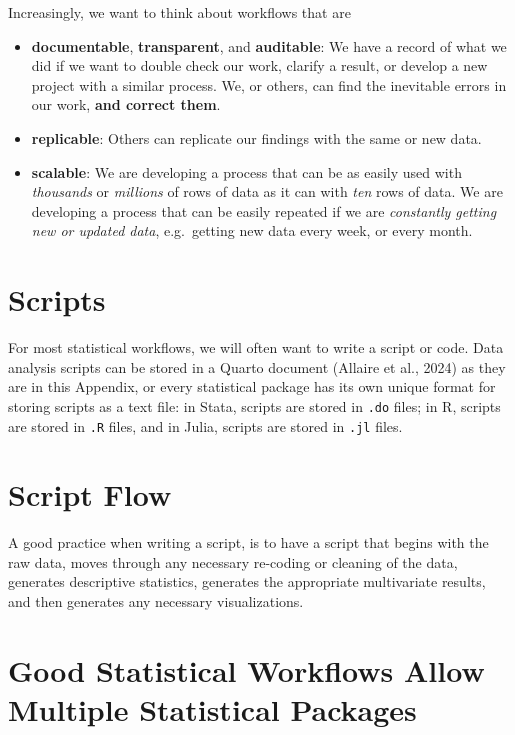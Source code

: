 \documentclass[
  letterpaper,
  DIV=11,
  numbers=noendperiod]{scrreprt}
\providecommand{\tightlist}{%
  \setlength{\itemsep}{0pt}\setlength{\parskip}{0pt}}\usepackage{longtable,booktabs,array}
\begin{document}
Increasingly, we want to think about workflows that are

\begin{itemize}
\tightlist
\item
  \textbf{documentable}, \textbf{transparent}, and \textbf{auditable}:
  We have a record of what we did if we want to double check our work,
  clarify a result, or develop a new project with a similar process. We,
  or others, can find the inevitable errors in our work, \textbf{and
  correct them}.
\item
  \textbf{replicable}: Others can replicate our findings with the same
  or new data.
\item
  \textbf{scalable}: We are developing a process that can be as easily
  used with \emph{thousands} or \emph{millions} of rows of data as it
  can with \emph{ten} rows of data. We are developing a process that can
  be easily repeated if we are \emph{constantly getting new or updated
  data}, e.g.~getting new data every week, or every month.
\end{itemize}

\section{Scripts}\label{scripts}

For most statistical workflows, we will often want to write a script or
code. Data analysis scripts can be stored in a Quarto document (Allaire
et al., 2024) as they are in this Appendix, or every statistical package
has its own unique format for storing scripts as a text file: in Stata,
scripts are stored in \texttt{.do} files; in R, scripts are stored in
\texttt{.R} files, and in Julia, scripts are stored in \texttt{.jl}
files.

\section{Script Flow}\label{sec-script-flow}

A good practice when writing a script, is to have a script that begins
with the raw data, moves through any necessary re-coding or cleaning of
the data, generates descriptive statistics, generates the appropriate
multivariate results, and then generates any necessary visualizations.

\section{Good Statistical Workflows Allow Multiple Statistical
Packages}\label{sec-multiple-packages}
\end{document}
